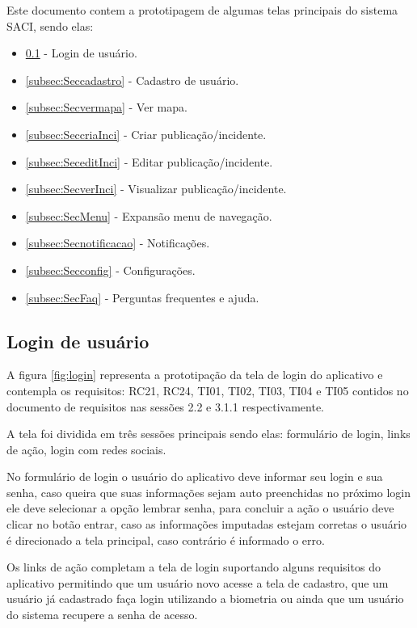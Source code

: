 \documentclass[12pt]{article}
\begin{document}
Este documento contem a prototipagem de algumas telas principais do sistema SACI, sendo elas:
\begin{itemize}%
    \item\ref{subsec:Seclogin} - Login de usuário.
    \item \ref{subsec:Seccadastro} - Cadastro de usuário.
    \item \ref{subsec:Secvermapa} - Ver mapa.
    \item \ref{subsec:SeccriaInci} - Criar publicação/incidente.
    \item \ref{subsec:SeceditInci} - Editar publicação/incidente.
    \item \ref{subsec:SecverInci} - Visualizar publicação/incidente.
    \item \ref{subsec:SecMenu} - Expansão menu de navegação.
    \item \ref{subsec:Secnotificacao} - Notificações.
    \item \ref{subsec:Secconfig} - Configurações.
    \item \ref{subsec:SecFaq} - Perguntas frequentes e ajuda.
\end{itemize}

\subsection{Login de usuário}\label{subsec:Seclogin}
A figura \ref{fig:login} representa a prototipação da tela de login do aplicativo e contempla os requisitos: RC21, RC24, TI01, TI02, TI03, TI04 e TI05 contidos no documento de requisitos nas sessões 2.2 e 3.1.1 respectivamente.

A tela foi dividida em três sessões principais sendo elas: formulário de login, links de ação, login com redes sociais.

No formulário de login o usuário do aplicativo deve informar seu login e sua senha, caso queira que suas informações sejam auto preenchidas no próximo login ele deve selecionar a opção lembrar senha, para concluir a ação o usuário deve clicar no botão entrar, caso as informações imputadas estejam corretas o usuário é direcionado a tela principal, caso contrário é informado o erro.

Os links de ação completam a tela de login suportando alguns requisitos do aplicativo permitindo que um usuário novo acesse a tela de cadastro, que um usuário já cadastrado faça login utilizando a biometria ou ainda que um usuário do sistema recupere a senha de acesso.
\end{document}
